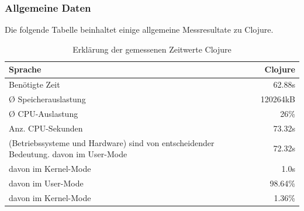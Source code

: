 \documentclass{fancydocument}
\begin{document}
\subsubsection{Allgemeine Daten}
Die folgende Tabelle beinhaltet einige allgemeine Messresultate zu Clojure. 
\begin{table}[h!]
\centering
\begin{tabular}{|p{6cm}|r|} \hline
Sprache & Clojure\\
\hline
Benötigte Zeit & 62.88s\\
\hline
Ø Speicherauslastung & 120264kB\\
\hline
Ø CPU-Auslastung & 26\%\\
\hline
Anz. CPU-Sekunden & 73.32s\\
\hline
 (Betriebssysteme und
Hardware) sind von entscheidender Bedeutung. davon im User-Mode & 72.32s\\
\hline
davon im Kernel-Mode & 1.0s\\
\hline
davon im User-Mode & 98.64\%\\
\hline
davon im Kernel-Mode & 1.36\%\\
\hline
\end{tabular}
\caption{Erklärung der gemessenen Zeitwerte Clojure}
\end{table}
\end{document}
